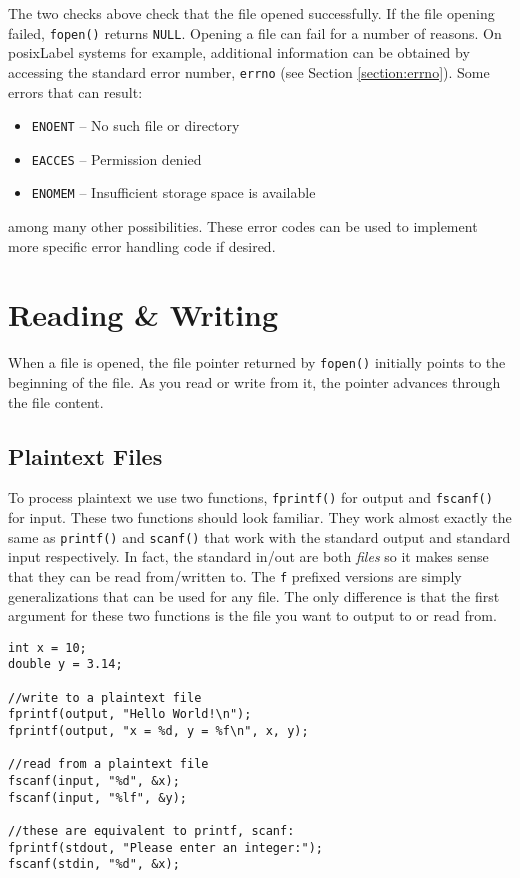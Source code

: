 The two checks above check that the file opened successfully.
If the file opening failed, \texttt{fopen()} returns
\texttt{NULL}.  Opening a file can fail for a number
of reasons.  On \gls{posixLabel} systems for example, additional
information can be obtained by accessing the standard error
number, \texttt{errno} (see Section \ref{section:errno}).  
Some errors that can result:
\begin{itemize}
  \item \texttt{ENOENT} -- No such file or directory
  \item \texttt{EACCES} -- Permission denied
  \item \texttt{ENOMEM} -- Insufficient storage space is available
\end{itemize}
among many other possibilities.  These error codes can be
used to implement more specific error handling code if desired.

\section{Reading \& Writing}

When a file is opened, the file pointer returned by
\texttt{fopen()} initially points to the beginning
of the file.  As you read or write from it, the pointer
advances through the file content.

\subsection{Plaintext Files}

To process plaintext we use two functions, \texttt{fprintf()}
for output and \texttt{fscanf()} for input.  These
two functions should look familiar.  They work almost 
exactly the same as \texttt{printf()} and
\texttt{scanf()} that work with the standard output
and standard input respectively.  In fact, the standard in/out
are both \emph{files} so it makes sense that they can be
read from/written to.  The \texttt{f} prefixed versions
are simply generalizations that can be used for any file.
The only difference is that the first argument for these
two functions is the file you want to output to or read from.

\begin{verbatim}
int x = 10;
double y = 3.14;

//write to a plaintext file
fprintf(output, "Hello World!\n");
fprintf(output, "x = %d, y = %f\n", x, y);

//read from a plaintext file
fscanf(input, "%d", &x);
fscanf(input, "%lf", &y);

//these are equivalent to printf, scanf:
fprintf(stdout, "Please enter an integer:");
fscanf(stdin, "%d", &x);
\end{verbatim}

